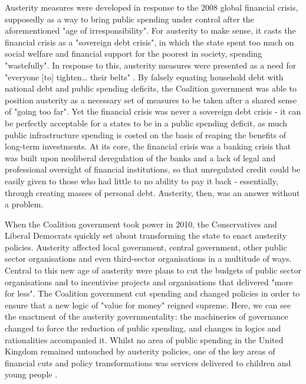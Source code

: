 Austerity measures were developed in response to the 2008 global financial crisis, supposedly as a way to bring public spending under control after the aforementioned "age of irresponsibility". For austerity to make sense, it casts the financial crisis as a "sovereign debt crisis", in which the state spent too much on social welfare and financial support for the poorest in society, spending "wastefully". In response to this, austerity measures were presented as a need for "everyone [to] tighten\ldots{} their belts" \citep[13]{blyth_austerity_2013}. By falsely equating household debt with national debt and public spending deficits, the Coalition government was able to position austerity as a necessary set of measures to be taken after a shared sense of "going too far". Yet the financial crisis was never a sovereign debt crisis - it can be perfectly acceptable for a states to be in a public spending deficit, as much public infrastructure spending is costed on the basis of reaping the benefits of long-term investments. At its core, the financial crisis was a banking crisis that was built upon neoliberal deregulation of the banks and a lack of legal and professional oversight of financial institutions, so that unregulated credit could be easily given to those who had little to no ability to pay it back - essentially, through creating masses of personal debt. Austerity, then, was an answer without a problem.

When the Coalition government took power in 2010, the Conservatives and Liberal Democrats quickly set about transforming the state to enact austerity policies. Austerity affected local government, central government, other public sector organisations and even third-sector organisations in a multitude of ways. Central to this new age of austerity were plans to cut the budgets of public sector organisations and to incentivise projects and organisations that delivered "more for less". The Coalition government cut spending and changed policies in order to ensure that a new logic of "value for money" reigned supreme.  Here, we can see the enactment of the austerity governmentality: the machineries of governance changed to force the reduction of public spending, and changes in logics and rationalities accompanied it. Whilst no area of public spending in the United Kingdom remained untouched by austerity policies, one of the key areas of financial cuts and policy transformations was services delivered to children and young people \citep{youdell_assembling_2015}.

